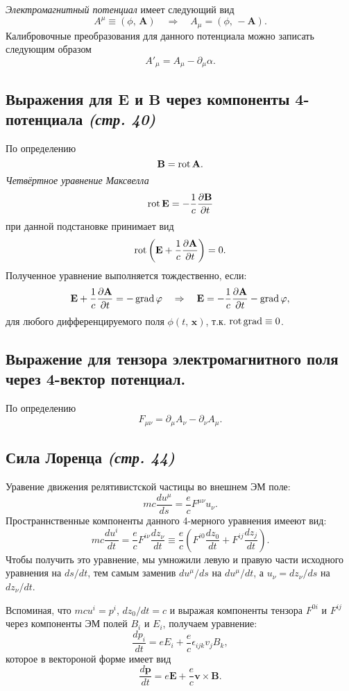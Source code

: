 \documentclass[a4paper,12pt]{article}
\begin{document}
\emph{Электромагнитный  потенциал} имеет следующий вид
\[
	A^\mu\equiv(\phi,\,\mathbf{A})\quad \Rightarrow\quad A_\mu=(\phi,\,-\mathbf{A})
.\]
Калибровочные преобразования для данного потенциала можно записать следующим
образом
\[
A'_\mu=A_\mu-\partial_\mu \alpha
.\] 
\subsection{Выражения для $\mathbf{E}$ и $\mathbf{B}$ через компоненты 4-потенциала
\emph{(стр. 40)}}
\label{subsec:13}
По определению
\[
\mathbf{B}=\operatorname{rot} \mathbf{A}
.\] 
\emph{Четвёртное уравнение Максвелла}
\begin{equation*}
	\operatorname{rot} \mathbf{E}=-\frac{1}{c}\frac{\partial \mathbf{B}}{\partial t} 
\end{equation*}
при данной подстановке принимает вид
\[
	\operatorname{rot} \left( \mathbf{E}+\frac{1}{c}\frac{\partial \mathbf{A}}{\partial t}  \right) =0
.\]
Полученное уравнение выполняется тождественно, если:
\[
\mathbf{E}+\frac{1}{c}\frac{\partial \mathbf{A}}{\partial t}=-\operatorname{grad} \varphi
\quad \Rightarrow \quad \mathbf{E}=-\frac{1}{c}\frac{\partial \mathbf{A}}{\partial t}-
\operatorname{grad} \varphi
,\]
для любого дифференцируемого поля $\phi(t,\,\mathbf{x})$, т.\:к. $\operatorname{rot} \operatorname{grad} \equiv 0$.
\subsection{Выражение для тензора электромагнитного поля через 4-вектор
потенциал.}
По определению
\[
F_{\mu\nu}=\partial_\mu A_\nu -\partial_\nu A_\mu
.\] 
\subsection{Сила Лоренца \emph{(стр. 44)}}
Уравение движения релятивистской частицы во внешнем ЭМ поле:
\[
	mc \frac{du^\mu}{ds}=\frac{e}{c}F^{\mu\nu}u_{\nu}
.\]
Пространнственные компоненты данного 4-мерного уравнения имееют вид:
\[
mc \frac{du^i}{dt}=\frac{e}{c}F^{i\nu} \frac{dz_\nu}{dt}\equiv
\frac{e}{c}\left( F^{i0} \frac{dz_0}{dt}+F^{ij}\frac{dz_j}{dt} \right) 
.\]
Чтобы получить это уравнение, мы умножили левую и правую части исходного
уравнения на $ds /dt$, тем  самым заменив  $du^\mu /ds$ на  $du^\mu/dt$, а
$u_\nu=dz_\nu /ds$ на  $dz_\nu /dt$.

Вспоминая, что $mcu^i=p^i$, $dz_0 /dt=c$ и выражая компоненты тензора $F^{0i}$ 
и $F^{ij}$ через компоненты ЭМ полей $B_i$ и $E_i$, получаем уравнение:
 \[
\frac{dp_i}{dt}=eE_i+\frac{e}{c}\epsilon_{ijk}v_jB_k
,\] 
которое в вектороной форме имеет вид
\[
\frac{d\mathbf{p}}{dt}=e \mathbf{E}+\frac{e}{c}\mathbf{v} \times
\mathbf{B} 
.\] 
\end{document}
